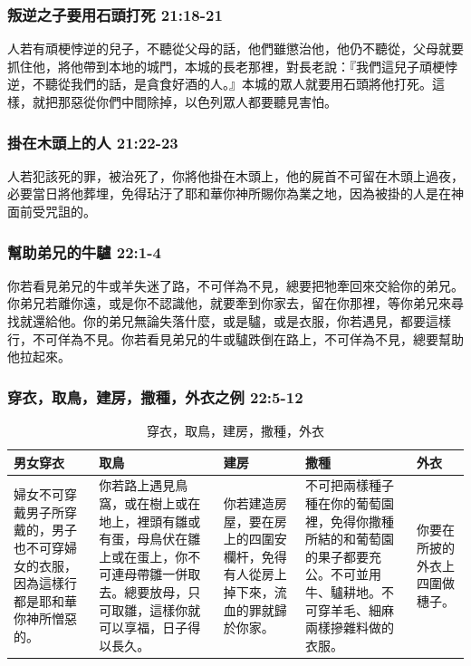 \subsubsection{叛逆之子要用石頭打死 21:18-21 }
人若有頑梗悖逆的兒子，不聽從父母的話，他們雖懲治他，他仍不聽從，父母就要抓住他，將他帶到本地的城門，本城的長老那裡，對長老說：『我們這兒子頑梗悖逆，不聽從我們的話，是貪食好酒的人。』本城的眾人就要用石頭將他打死。這樣，就把那惡從你們中間除掉，以色列眾人都要聽見害怕。

\subsubsection{掛在木頭上的人 21:22-23 }
人若犯該死的罪，被治死了，你將他掛在木頭上，他的屍首不可留在木頭上過夜，必要當日將他葬埋，免得玷汙了耶和華你神所賜你為業之地，因為被掛的人是在神面前受咒詛的。

\subsubsection{幫助弟兄的牛驢 22:1-4 }
你若看見弟兄的牛或羊失迷了路，不可佯為不見，總要把牠牽回來交給你的弟兄。你弟兄若離你遠，或是你不認識他，就要牽到你家去，留在你那裡，等你弟兄來尋找就還給他。你的弟兄無論失落什麼，或是驢，或是衣服，你若遇見，都要這樣行，不可佯為不見。你若看見弟兄的牛或驢跌倒在路上，不可佯為不見，總要幫助他拉起來。

\subsubsection{穿衣，取鳥，建房，撒種，外衣之例 22:5-12 }
\begin{table}[H]
\begin{center}
\begin{tabular}{ p{2.5cm}|p{}|p{2.50cm}|p{}|p{1.5cm}} \toprule
男女穿衣&取鳥&建房&撒種&外衣\\\hline
婦女不可穿戴男子所穿戴的，男子也不可穿婦女的衣服，因為這樣行都是耶和華你神所憎惡的。&你若路上遇見鳥窩，或在樹上或在地上，裡頭有雛或有蛋，母鳥伏在雛上或在蛋上，你不可連母帶雛一併取去。總要放母，只可取雛，這樣你就可以享福，日子得以長久。 &你若建造房屋，要在房上的四圍安欄杆，免得有人從房上掉下來，流血的罪就歸於你家。&不可把兩樣種子種在你的葡萄園裡，免得你撒種所結的和葡萄園的果子都要充公。不可並用牛、驢耕地。不可穿羊毛、細麻兩樣摻雜料做的衣服。&你要在所披的外衣上四圍做穗子。\\\hline
\end{tabular}
\end{center}
\caption{穿衣，取鳥，建房，撒種，外衣}
\end{table}



